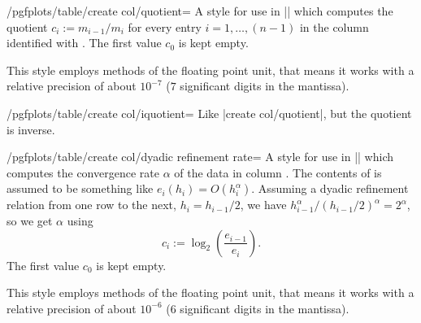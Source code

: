 \documentclass[a4paper]{ltxdoc}
\begin{document}
\begin{stylekey}{/pgfplots/table/create col/quotient=}
    A style for use in |\pgfplotstablecreatecol| which computes the quotient
    $c_i := m_{i-1} / m_i$ for every entry $i = 1,\dotsc, (n-1)$ in the column
    identified with . The first value $c_0$ is kept empty.
\begin{codeexample}[]

\end{codeexample}
    This style employs methods of the floating point unit, that means it works
    with a relative precision of about $10^{-7}$ ($7$ significant digits in the
    mantissa).
\end{stylekey}

\begin{stylekey}{/pgfplots/table/create col/iquotient=}
    Like |create col/quotient|, but the quotient is inverse.
\end{stylekey}

\begin{stylekey}{/pgfplots/table/create col/dyadic refinement rate=}
    A style for use in |\pgfplotstablecreatecol| which computes the convergence
    rate $\alpha$ of the data in column . The contents of
     is assumed to be something like $e_i(h_i) =
    O(h_i^\alpha)$. Assuming a dyadic refinement relation from one row to the
    next, $h_i = h_{i-1}/2$, we have $h_{i-1}^\alpha / (h_{i-1}/2)^\alpha =
    2^\alpha$, so we get $\alpha$ using
        \[
            c_i := \log_2\left( \frac{e_{i-1}}{e_i} \right).
        \]
    The first value $c_0$ is kept empty.
\begin{codeexample}[]
\end{codeexample}
    This style employs methods of the floating point unit, that means it works
    with a relative precision of about $10^{-6}$ ($6$ significant digits in the
    mantissa).
\end{stylekey}
\end{document}
